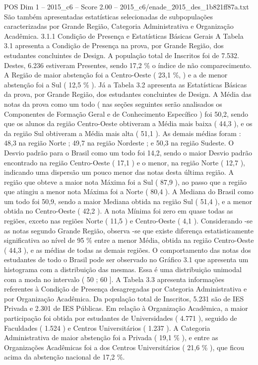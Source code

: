\begin{textsample}{POS Dim 1 – 2015\_c6 – Score 2.00 – 2015\_c6/enade\_2015\_des\_1b821ff87a.txt}
São também apresentadas estatísticas selecionadas de subpopulações caracterizadas por Grande Região, Categoria Administrativa e Organização Acadêmica. 3.1.1 Condição de Presença e Estatísticas Básicas Gerais A Tabela 3.1 apresenta a Condição de Presença na prova, por Grande Região, dos estudantes concluintes de Design.
A população total de Inscritos foi de 7.532.
Destes, 6.236 estiveram Presentes, sendo 17,2 \% o índice de não comparecimento.
A Região de maior abstenção foi a Centro-Oeste ( 23,1 \%, ) e a de menor abstenção foi a Sul ( 12,5 \% ).
Já a Tabela 3.2 apresenta as Estatísticas Básicas da prova, por Grande Região, dos estudantes concluintes de Design.
A Média das notas da prova como um todo ( nas seções seguintes serão analisados os Componentes de Formação Geral e de Conhecimento Específico ) foi 50,2, sendo que os alunos da região Centro-Oeste obtiveram a Média mais baixa ( 44,3 ), e os da região Sul obtiveram a Média mais alta ( 51,1 ).
As demais médias foram : 48,3 na região Norte ; 49,7 na região Nordeste ; e 50,3 na região Sudeste.
O Desvio padrão para o Brasil como um todo foi 14,2, sendo o maior Desvio padrão encontrado na região Centro-Oeste ( 17,1 ) e o menor, na região Norte ( 12,7 ), indicando uma dispersão um pouco menor das notas desta última região.
A região que obteve a maior nota Máxima foi a Sul ( 87,9 ), ao passo que a região que atingiu a menor nota Máxima foi a Norte ( 80,4 ).
A Mediana do Brasil como um todo foi 50,9, sendo a maior Mediana obtida na região Sul ( 51,4 ), e a menor obtida no Centro-Oeste ( 42,2 ).
A nota Mínima foi zero em quase todas as regiões, exceto nas regiões Norte ( 11,5 ) e Centro-Oeste ( 4,1 ).
Considerando -se as notas segundo Grande Região, observa -se que existe diferença estatisticamente significativa ao nível de 95 \% entre a menor Média, obtida na região Centro-Oeste ( 44,3 ), e as médias de todas as demais regiões.
O comportamento das notas dos estudantes de todo o Brasil pode ser observado no Gráfico 3.1 que apresenta um histograma com a distribuição das mesmas.
Essa é uma distribuição unimodal com a moda no intervalo ( 50 ; 60 ].
A Tabela 3.3 apresenta informações referentes à Condição de Presença desagregadas por Categoria Administrativa e por Organização Acadêmica.
Da população total de Inscritos, 5.231 são de IES Privada e 2.301 de IES Públicas.
Em relação à Organização Acadêmica, a maior participação foi obtida por estudantes de Universidades ( 4.771 ), seguido de Faculdades ( 1.524 ) e Centros Universitários ( 1.237 ).
A Categoria Administrativa de maior abstenção foi a Privada ( 19,1 \% ), e entre as Organizações Acadêmicas foi a dos Centros Universitários ( 21,6 \% ), que ficou acima da abstenção nacional de 17,2 \%.

\end{textsample}
